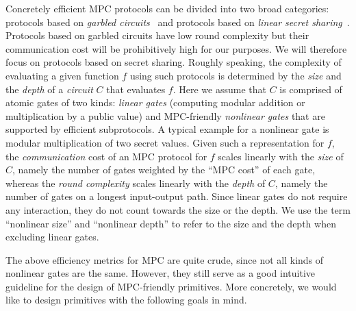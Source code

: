 Concretely efficient MPC protocols can be divided into two broad categories: protocols based on {\em garbled circuits}~\cite{Yao} and protocols based on {\em linear secret sharing}~\cite{GMW,BGW,CCD}. Protocols based on garbled circuits have low round complexity but their communication cost will be prohibitively high for our purposes. We will therefore focus on protocols based on secret sharing. Roughly speaking, the complexity of evaluating  a given function $f$ using such protocols is determined by the {\em size} and the {\em depth} of a {\em circuit} $C$ that evaluates $f$.  Here we assume that $C$ is comprised of atomic gates of two kinds: {\em linear gates} (computing modular addition or multiplication by a public value) and MPC-friendly {\em nonlinear gates}  that are supported by efficient subprotocols. A typical example for a nonlinear gate is modular multiplication of two secret values. Given such a representation for $f$, the {\em communication} cost of an MPC protocol for $f$ scales linearly with the {\em size} of $C$, namely the number of gates weighted by the ``MPC cost'' of each gate, whereas the {\em round complexity} scales linearly with the {\em depth} of $C$, namely the number of gates on a longest input-output path. Since linear gates do not require any interaction, they do not count towards the size or the depth. We use the term ``nonlinear size'' and ``nonlinear depth'' to refer to the size and the depth when excluding linear gates.

  The above efficiency metrics for MPC are quite crude, since not all kinds of nonlinear gates are the same. However, they still serve as a good intuitive guideline for the design of MPC-friendly primitives. More concretely, we would like to design primitives with the following goals in mind.


